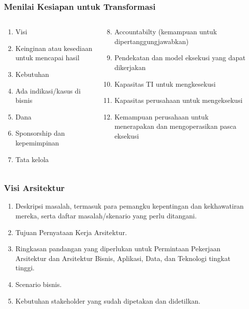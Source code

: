 \documentclass[aspectratio=169]{beamer}
\begin{document}
	\begin{frame}
		\frametitle{Menilai Kesiapan untuk Transformasi}
		\begin{columns}
			\begin{column}{0.5\textwidth}
				\begin{enumerate}
					\item Visi
					\item Keinginan atau kesediaan untuk mencapai hasil
					\item Kebutuhan
					\item Ada indikasi/kasus di bisnis
					\item Dana
					\item Sponsorship dan kepemimpinan
					\item Tata kelola
					
				\end{enumerate}
			\end{column}
			\begin{column}{0.5\textwidth}
				\begin{enumerate}
					\setcounter{enumi}{7}
					\item Accountabilty (kemampuan untuk dipertanggungjawabkan)
					\item Pendekatan dan model eksekusi yang dapat dikerjakan
					\item Kapasitas TI untuk mengkesekusi
					\item Kapasitas perusahaan untuk mengeksekusi
					\item Kemampuan perusahaan untuk menerapakan dan mengoperasikan pasca eksekusi
				\end{enumerate}
			\end{column}
		\end{columns}
	\end{frame}
	
	\begin{frame}
		\frametitle{Visi Arsitektur}
		\begin{enumerate}
			\item Deskripsi masalah, termasuk para pemangku kepentingan dan kekhawatiran mereka, serta daftar masalah/skenario yang perlu ditangani.
			\item Tujuan Pernyataan Kerja Arsitektur.
			\item Ringkasan pandangan yang diperlukan untuk Permintaan Pekerjaan Arsitektur dan Arsitektur Bisnis, Aplikasi, Data, dan Teknologi tingkat tinggi.
			\item Scenario bisnis.
			\item Kebutuhan stakeholder yang sudah dipetakan dan didetilkan.
		\end{enumerate}
	\end{frame}
	
\end{document}
